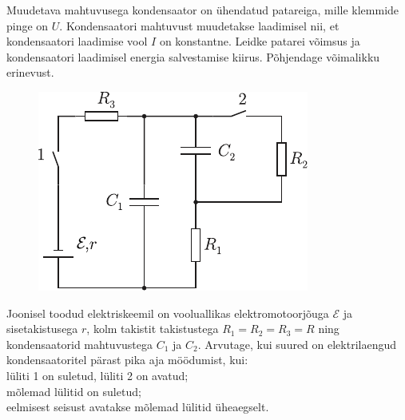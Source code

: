 \documentclass[10pt, twoside]{article}
\begin{document}
{%

Muudetava mahtuvusega kondensaator on ühendatud patareiga,
mille klemmide pinge on $U$. Kondensaatori mahtuvust muudetakse laadimisel nii, et
kondensaatori laadimise vool $I$ on konstantne. Leidke patarei võimsus ja kondensaatori laadimisel energia salvestamise kiirus.
Põhjendage võimalikku erinevust.
\probend
\bigskip


\begin{figure}
	\begin{center}
		\vspace{-25pt}
		\includegraphics[width=\linewidth]{2006-v2g-07-yl}
	\end{center}
\end{figure}
Joonisel toodud elektriskeemil on vooluallikas elektromotoorjõuga $\mathcal E$ ja sisetakistusega $r$, kolm takistit takistustega $R_1 = R_2 = R_3 = R$ ning kondensaatorid mahtuvustega $C_1$ ja $C_2$. Arvutage, kui suured on elektrilaengud kondensaatoritel pärast pika aja möödumist, kui:\\
\osa lüliti 1 on suletud, lüliti 2 on avatud;\\
\osa mõlemad lülitid on suletud;\\
\osa eelmisest seisust avatakse mõlemad lülitid üheaegselt.
\probend
\newpage

}
\end{document}
